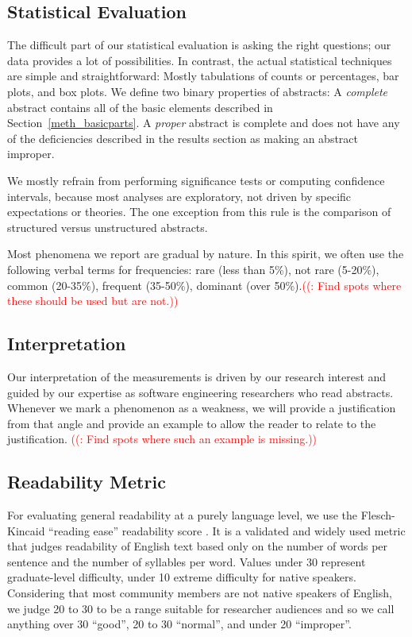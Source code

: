 \documentclass[10pt,journal,compsoc]{IEEEtran}
\newcounter{todonumber}
\newcommand{\Todo}[1]{\stepcounter{todonumber}\textcolor{red}{\sffamily ((\arabic{todonumber}: #1))}}
\begin{document}
\subsection{Statistical Evaluation}\label{statisticalevaluation}

The difficult part of our statistical evaluation is asking the right questions;
our data provides a lot of possibilities.
In contrast, the actual statistical techniques are simple and straightforward:
Mostly tabulations of counts or percentages, bar plots, and box plots.
We define two binary properties of abstracts: 
A \emph{complete} abstract contains all of the basic elements described in 
Section~\ref{meth_basicparts}.
A \emph{proper} abstract is complete and does not have any of the deficiencies
described in the results section as making an abstract improper.

We mostly refrain from performing significance tests or computing confidence intervals,
because most analyses are exploratory, not driven by specific expectations or theories.
The one exception from this rule is the comparison of
structured versus unstructured abstracts.

Most phenomena we report are gradual by nature.
In this spirit, we often use the following verbal terms for frequencies:
rare (less than 5\%),
not rare (5-20\%),
common (20-35\%),
frequent (35-50\%),
dominant (over 50\%).\Todo{Find spots where these should be used but are not.}


\subsection{Interpretation}

Our interpretation of the measurements is driven by our research interest and
guided by our expertise as software engineering researchers who read abstracts.
Whenever we mark a phenomenon as a weakness, we will provide a justification from that angle
and provide an example to allow the reader to relate to the justification.
\Todo{Find spots where such an example is missing.}


\subsection{Readability Metric}

For evaluating general readability at a purely language level,
we use the Flesch-Kincaid ``reading ease'' readability score \cite{KinFisRog75}.
It is a validated and widely used metric that judges readability of English text
based only on the number of words per sentence and the number of
syllables per word.
Values under 30 represent graduate-level difficulty,
under 10 extreme difficulty for native speakers.
Considering that most community members are not native speakers of English,
we judge 20 to 30 to be a range suitable for researcher audiences and so
we call anything over 30 ``good'',
20 to 30 ``normal'', and
under 20 ``improper''.
\end{document}

